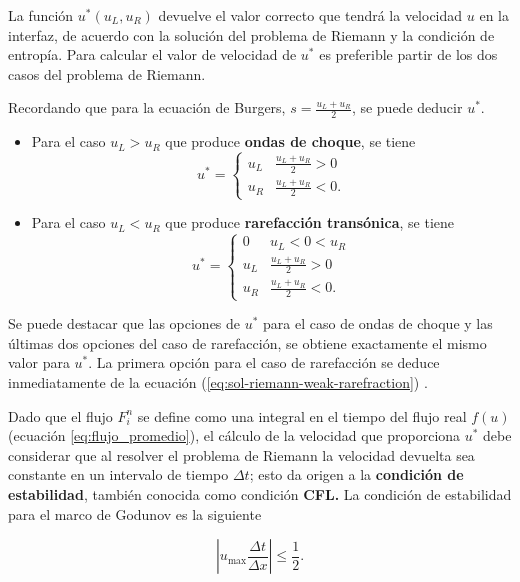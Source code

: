 \documentclass[12pt]{article}
\begin{document}
 	
 	La función $u^{*}(u_L, u_R)$ devuelve el valor correcto que tendrá la velocidad $u$ en la interfaz, de acuerdo con la solución del problema de Riemann y la condición de entropía. Para calcular el valor de velocidad de $u^{*}$ es preferible partir de los dos casos del problema de Riemann.
 	
	Recordando que para la ecuación de Burgers, $s = \frac{u_L + u_R}{2}$, se puede deducir $u^{*}$. 
 	
 	\begin{itemize}
 		\item Para el caso $u_L > u_R$ que produce \textbf{ondas de choque}, se tiene
 		\begin{equation}
 			u^{*} =
 			\begin{cases}
 				u_{L} & \frac{u_L + u_R}{2} > 0 \\
 				u_{R} & \frac{u_L + u_R}{2} < 0.
 			\end{cases}
 		\end{equation}
 		\item Para el caso $u_L < u_R$ que produce \textbf{rarefacción transónica}, se tiene
 		\begin{equation}
 			u^{*} =
 			\begin{cases}
 				0 & u_{L} < 0 < u_{R}\\
 				u_{L} & \frac{u_L + u_R}{2} > 0 \\
 				u_{R} & \frac{u_L + u_R}{2} < 0.
 			\end{cases}
 		\end{equation}
 	\end{itemize}
 	Se puede destacar que las opciones de $u^{*}$ para el caso de ondas de choque y las últimas dos opciones del caso de rarefacción, se obtiene exactamente el mismo valor para $u^{*}$. La primera opción para el caso de rarefacción se deduce inmediatamente de la ecuación (\ref{eq:sol-riemann-weak-rarefraction}) \cite{pletcher1997computational}.
 	
 	Dado que el flujo $F_{i}^{n}$ se define como una integral en el tiempo del flujo real $f(u)$ (ecuación \ref{eq:flujo_promedio}), el cálculo de la velocidad que proporciona $u^{*}$ debe considerar que al resolver el problema de Riemann la velocidad devuelta sea constante en un intervalo de tiempo $\Delta t$; esto da origen a la \textbf{condición de estabilidad}, también conocida como condición \textbf{CFL.} La condición de estabilidad para el marco de Godunov es la siguiente \cite{pletcher1997computational}
 	
 	\begin{equation}
 		\left| u_{\text{max}} \frac{\Delta t}{\Delta x}\right| \leq \frac{1}{2} .
 	\end{equation}
 	 
\end{document}
